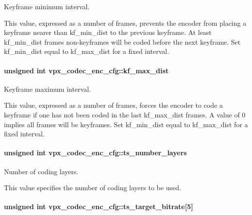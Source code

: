 Keyframe minimum interval. 

This value, expressed as a number of frames, prevents the encoder from placing a keyframe nearer than kf\-\_\-min\-\_\-dist to the previous keyframe. At least kf\-\_\-min\-\_\-dist frames non-\/keyframes will be coded before the next keyframe. Set kf\-\_\-min\-\_\-dist equal to kf\-\_\-max\-\_\-dist for a fixed interval. \hypertarget{structvpx__codec__enc__cfg_ae018440136e271743376730413d25a9b}{
\paragraph[{kf\-\_\-max\-\_\-dist}]{\setlength{\rightskip}{0pt plus 5cm}unsigned int vpx\-\_\-codec\-\_\-enc\-\_\-cfg\-::kf\-\_\-max\-\_\-dist}}\label{structvpx__codec__enc__cfg_ae018440136e271743376730413d25a9b}


Keyframe maximum interval. 

This value, expressed as a number of frames, forces the encoder to code a keyframe if one has not been coded in the last kf\-\_\-max\-\_\-dist frames. A value of 0 implies all frames will be keyframes. Set kf\-\_\-min\-\_\-dist equal to kf\-\_\-max\-\_\-dist for a fixed interval. \hypertarget{structvpx__codec__enc__cfg_a16d4549a30cbd585e3c3056ef873d8c7}{
\paragraph[{ts\-\_\-number\-\_\-layers}]{\setlength{\rightskip}{0pt plus 5cm}unsigned int vpx\-\_\-codec\-\_\-enc\-\_\-cfg\-::ts\-\_\-number\-\_\-layers}}\label{structvpx__codec__enc__cfg_a16d4549a30cbd585e3c3056ef873d8c7}


Number of coding layers. 

This value specifies the number of coding layers to be used. \hypertarget{structvpx__codec__enc__cfg_aba7ceb7a90500a8f76aff89575737f3a}{
\paragraph[{ts\-\_\-target\-\_\-bitrate}]{\setlength{\rightskip}{0pt plus 5cm}unsigned int vpx\-\_\-codec\-\_\-enc\-\_\-cfg\-::ts\-\_\-target\-\_\-bitrate\mbox{[}5\mbox{]}}}\label{structvpx__codec__enc__cfg_aba7ceb7a90500a8f76aff89575737f3a}


